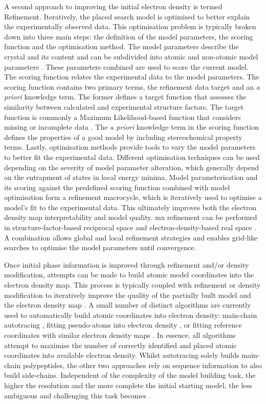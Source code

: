 A second approach to improving the initial electron density is termed Refinement. Iteratively, the placed search model is optimised to better explain the experimentally observed data. This optimisation problem is typically broken down into three main steps: the definition of the model parameters, the scoring function and the optimisation method. The model parameters describe the crystal and its content and can be subdivided into atomic and non-atomic model parameters \cite{Afonine2012-bg}. These parameters combined are used to score the current model. The scoring function relates the experimental data to the model parameters. The scoring function contains two primary terms, the refinement data target and an \textit{a priori} knowledge term. The former defines a target function that assesses the similarity between calculated and experimental structure factors. The target function is commonly a Maximum Likelihood-based function that considers missing or incomplete data \cite{Murshudov2011-ww,Afonine2012-bg}. The \textit{a priori} knowledge term in the scoring function defines the properties of a good model by including stereochemical property terms. Lastly, optimisation methods provide tools to vary the model parameters to better fit the experimental data. Different optimisation techniques can be used depending on the severity of model parameter alteration, which generally depend on the entrapment of states in local energy minima. Model parameterisation and its scoring against the predefined scoring function combined with model optimisation form a refinement macrocycle, which is iteratively used to optimise a model's fit to the experimental data. This ultimately improves both the electron density map interpretability and model quality. \gls{mx} refinement can be performed in structure-factor-based reciprocal space and electron-density-based real space \cite{Afonine2012-bg}. A combination allows global and local refinement strategies and enables grid-like searches to optimise the model parameters until convergence.

Once initial phase information is improved through refinement and/or density modification, attempts can be made to build atomic model coordinates into the electron density map. This process is typically coupled with refinement or density modification to iteratively improve the quality of the partially built model and the electron density map \cite{Rupp2010-nc}. A small number of distinct algorithms are currently used to automatically build atomic coordinates into electron density: main-chain autotracing \cite{Sheldrick2010-cx}, fitting pseudo-atoms into electron density \cite{Lamzin2001-cn}, or fitting reference coordinates with similar electron density maps \cite{Terwilliger2004-ig,Cowtan2006-xv}. In essence, all algorithms attempt to maximise the number of correctly identified and placed atomic coordinates into available electron density. Whilst autotracing solely builds main-chain polypeptides, the other two approaches rely on sequence information to also build side-chains. Independent of the complexity of the model building task, the higher the resolution and the more complete the initial starting model, the less ambiguous and challenging this task becomes \cite{Rupp2010-nc}. 


